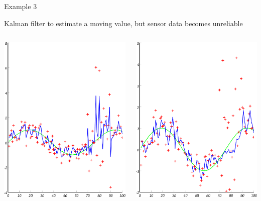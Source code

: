 \documentclass[compress]{beamer}
\begin{document}
\begin{frame}{Example 3}

  Kalman filter to estimate a moving value, but sensor data becomes
  unreliable

    \begin{columns}
        \begin{column}{0.5\linewidth}
            \begin{center}
                \includegraphics[width=0.8\linewidth]{kalman3}
            \end{center}
        \end{column}
        \begin{column}{0.5\linewidth}
            \begin{center}
                \includegraphics[width=0.8\linewidth]{kalman4}

\end{center}
\end{column}
\end{columns}
\end{frame}
\end{document}
